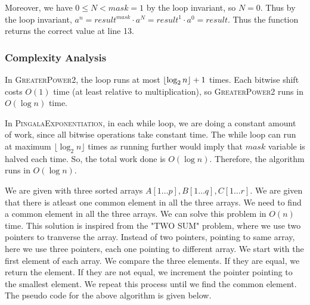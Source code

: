 \documentclass[12pt]{article}
\begin{document}
Moreover, we have $0 \leq N < mask = 1$ by the loop invariant, so $N = 0$.
Thus by the loop invariant, $a^{n} = result^{mask} \cdot a^{N} = result^{1} \cdot a^{0} = result$.
Thus the function returns the correct value at line 13.


\subsubsection*{Complexity Analysis}
In \textsc{GreaterPower2}, the loop runs at most $\floor{\log_2 n} + 1$ times.
Each bitwise shift costs $O(1)$ time (at least relative to multiplication), so
\textsc{GreaterPower2} runs in $O(\log n)$ time.

In \textsc{PingalaExponentiation}, in each while loop, we are doing a constant amount of work,
since all bitwise operations take constant time.
The while loop can run at maximum $\lfloor \log_2 n \rfloor$ times as running further would imply that $mask$ variable is halved each time.
So, the total work done is $O(\log n)$.
Therefore, the algorithm runs in $O(\log n)$.

\begin{problem}
    
\end{problem}
We are given with three sorted arrays $A[1\ldots p], B[1\ldots q], C[1\ldots r]$. We are given that there is atleast one common element in all the three arrays. We need to find a common element in all the three arrays. We can solve this problem in $O(n)$ time. This solution is inspired from the "TWO SUM" problem, where we use two pointers to tranverse the array. Instead of two pointers, pointing to same array, here we use three pointers, each one pointing to different array. We start with the first element of each array. We compare the three elements. If they are equal, we return the element. If they are not equal, we increment the pointer pointing to the smallest element. We repeat this process until we find the common element. The pseudo code for the above algorithm is given below.
\end{document}
